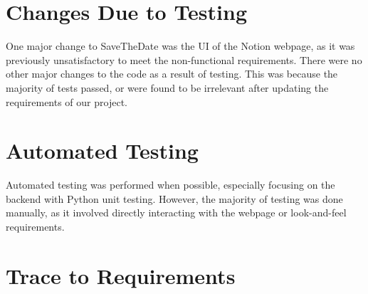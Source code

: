 \documentclass[12pt, titlepage]{article}
\begin{document}
\section{Changes Due to Testing}
One major change to SaveTheDate was the UI of the Notion webpage, as it was previously unsatisfactory to meet 
the non-functional requirements. There were no other major changes to the code as a result of testing. This was because the majority of tests passed, or were found to be irrelevant after updating the requirements of our project.

\section{Automated Testing}
Automated testing was performed when possible, especially focusing on the backend with Python unit testing.
However, the majority of testing was done manually, as it involved directly interacting with the webpage or 
look-and-feel requirements.

\newpage

\section{Trace to Requirements}
\end{document}
